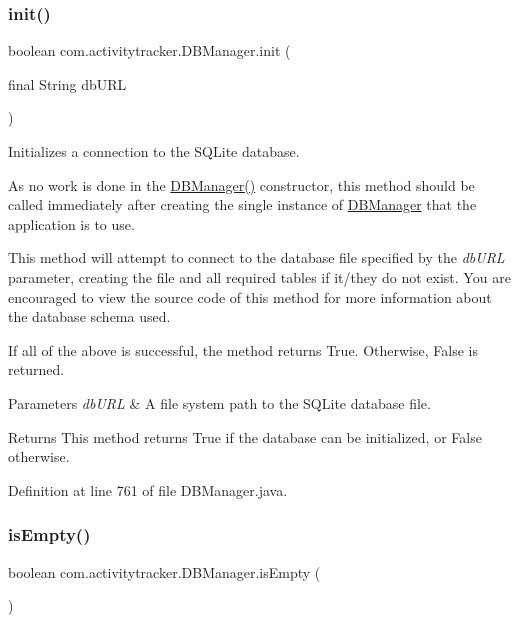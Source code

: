\subsubsection{\texorpdfstring{init()}{init()}}
{\footnotesize\ttfamily boolean com.\+activitytracker.\+D\+B\+Manager.\+init (\begin{DoxyParamCaption}\item[{final String}]{db\+U\+RL }\end{DoxyParamCaption})\hspace{0.3cm}{\ttfamily [package]}}

Initializes a connection to the S\+Q\+Lite database.

As no work is done in the \mbox{\hyperlink{classcom_1_1activitytracker_1_1_d_b_manager_ac1f558ef56fe02d74fe103a473a15bb5}{D\+B\+Manager()}} constructor, this method should be called immediately after creating the single instance of \mbox{\hyperlink{classcom_1_1activitytracker_1_1_d_b_manager}{D\+B\+Manager}} that the application is to use.

This method will attempt to connect to the database file specified by the {\itshape db\+U\+RL} parameter, creating the file and all required tables if it/they do not exist. You are encouraged to view the source code of this method for more information about the database schema used.

If all of the above is successful, the method returns True. Otherwise, False is returned.


\begin{DoxyParams}{Parameters}
{\em db\+U\+RL} & A file system path to the S\+Q\+Lite database file.\\
\hline
\end{DoxyParams}
\begin{DoxyReturn}{Returns}
This method returns True if the database can be initialized, or False otherwise. 
\end{DoxyReturn}


Definition at line 761 of file D\+B\+Manager.\+java.

\mbox{\label{classcom_1_1activitytracker_1_1_d_b_manager_af9ab112f840e3c803b6b28a2f1a15215}} 
\subsubsection{\texorpdfstring{is\+Empty()}{isEmpty()}}
{\footnotesize\ttfamily boolean com.\+activitytracker.\+D\+B\+Manager.\+is\+Empty (\begin{DoxyParamCaption}{ }\end{DoxyParamCaption})\hspace{0.3cm}{\ttfamily [private]}}

